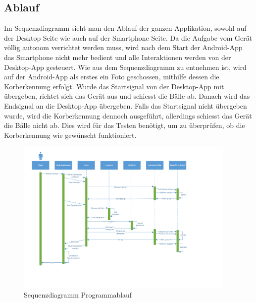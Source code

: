 \subsection{Ablauf}

Im Sequenzdiagramm sieht man den Ablauf der ganzen Applikation, sowohl auf der Desktop 
Seite wie auch auf der Smartphone Seite. Da die Aufgabe vom Gerät völlig autonom verrichtet 
werden muss, wird nach dem Start der Android-App das Smartphone nicht mehr bedient 
und alle Interaktionen werden von der Desktop-App gesteuert. 
Wie aus dem Sequenzdiagramm zu entnehmen ist, wird auf der Android-App als erstes ein 
Foto geschossen, mithilfe dessen die Korberkennung erfolgt. 
Wurde das Startsignal von der Desktop-App mit übergeben, richtet sich das Gerät aus und schiesst die Bälle ab. 
Danach wird das Endsignal an die Desktop-App übergeben.
Falls das Startsignal nicht übergeben wurde, wird die Korberkennung dennoch ausgeführt, 
allerdings schiesst das Gerät die Bälle nicht ab. Dies wird für das Testen benötigt, um 
zu überprüfen, ob die Korberkennung wie gewünscht funktioniert.


\begin{figure}[h!]
	\includegraphics[width=0.95\textwidth,clip,trim=12mm 35mm 55mm 5mm]
	{Enddokumentation/Bilder/Sequenzdiagramm_PREN2_v1.pdf}
	\centering
	\caption{Sequenzdiagramm Programmablauf}
	\label{abb:SequenzdiagrammSoftware}
\end{figure}


            
